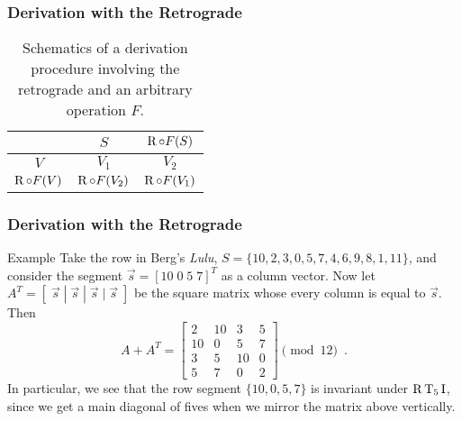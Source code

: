 
\begin{frame}
	\frametitle{Derivation with the Retrograde}
	\begin{table}
    	\caption{Schematics of a derivation procedure involving the retrograde and an arbitrary operation $F$.}
    	\centering
    	\vspace{12pt}
    	\begin{tabular}{c|cc}
        	\hline
        	& $S$ & $\operatorname{R} \circ F(S)$\\
        	\hline
        	$V$ & $V_1$ & $V_2$ \\
        	$\operatorname{R} \circ F(V)$ & $\operatorname{R} \circ F(V_2)$ & $\operatorname{R} \circ F(V_1)$ \\
        	\hline
    	\end{tabular}
	\end{table}
\end{frame}

\begin{frame}
	\frametitle{Derivation with the Retrograde}
	\begin{block}{Example}
		Take the row in Berg's \emph{Lulu}, $S = \{ 10, 2, 3, 0, 5, 7, 4, 6, 9, 8, 1, 11 \}$, and consider the segment $\vec{s} = [10 \; 0 \; 5 \; 7]^T$ as a column vector. Now let $A^T = [\;\vec{s} \; | \; \vec{s} \; | \; \vec{s} \; | \; \vec{s}\;]$ be the square matrix whose every column is equal to $\vec{s}$. Then
		\begin{equation*}
    		A + A^T = \begin{bmatrix}
    			2 & 10 & 3 & 5 \\
        		10 & 0 & 5 & 7 \\
        		3 & 5 & 10 & 0 \\
        		5 & 7 & 0 & 2
        	\end{bmatrix} \pmod{12} \enspace.
		\end{equation*}
		In particular, we see that the row segment $\{ 10, 0, 5, 7 \}$ is invariant under $\operatorname{R}\operatorname{T}_5\operatorname{I}$, since we get a main diagonal of fives when we mirror the matrix above vertically.
	\end{block}
\end{frame}

